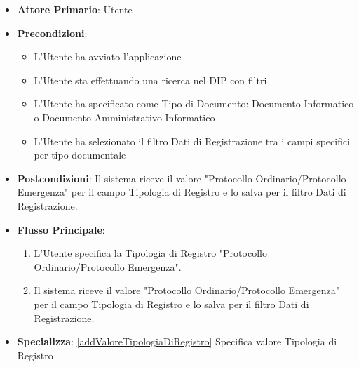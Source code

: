 \begin{itemize}
      \item \textbf{Attore Primario}: Utente
      \item \textbf{Precondizioni}: 
      \begin{itemize}            
            \item L'Utente ha avviato l'applicazione
            \item L'Utente sta effettuando una ricerca nel DIP con filtri
            \item L'Utente ha specificato come Tipo di Documento: Documento Informatico o Documento Amministrativo Informatico
            \item L'Utente ha selezionato il filtro Dati di Registrazione tra i campi specifici per tipo documentale
      \end{itemize}
      \item \textbf{Postcondizioni}: Il sistema riceve il valore "Protocollo Ordinario/Protocollo Emergenza" per il campo Tipologia di Registro e lo salva per il filtro Dati di Registrazione.
      \item \textbf{Flusso Principale}:
      \begin{enumerate}
            \item L'Utente specifica la Tipologia di Registro "Protocollo Ordinario/Protocollo Emergenza".
            \item Il sistema riceve il valore "Protocollo Ordinario/Protocollo Emergenza" per il campo Tipologia di Registro e lo salva per il filtro Dati di Registrazione.
      \end{enumerate}
      \item \textbf{Specializza}: \ref{addValoreTipologiaDiRegistro} Specifica valore Tipologia di Registro
\end{itemize}

